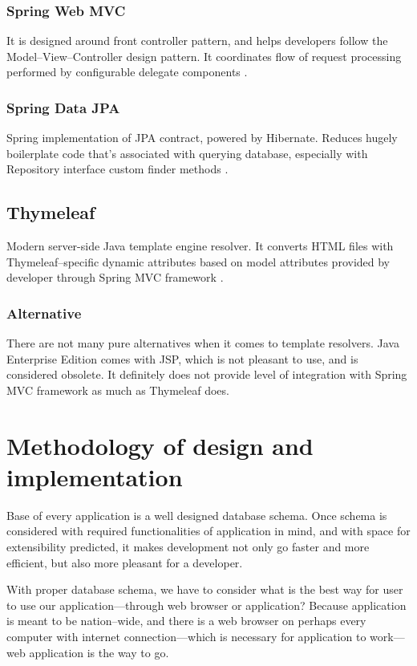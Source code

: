 \documentclass[a4paper,twoside,12pt]{book}
\begin{document}
      \subsubsection{Spring Web MVC}
        It is designed around front controller pattern, and helps developers follow the Model--View--Controller design pattern.
        It coordinates flow of request processing performed by configurable delegate components \cite{bib:spring_web_mvc}.
      
      \subsubsection{Spring Data JPA}
        Spring implementation of JPA contract, powered by Hibernate. Reduces hugely boilerplate code that's associated with querying database,
        especially with Repository interface custom finder methods \cite{bib:spring_data_jpa}.

    \subsection{Thymeleaf}
      Modern server-side Java template engine resolver. 
      It converts HTML files with Thymeleaf--specific dynamic attributes based on model attributes provided by developer through Spring MVC framework \cite{bib:thymeleaf}.
      
      \subsubsection{Alternative}
        There are not many pure alternatives when it comes to template resolvers. 
        Java Enterprise Edition comes with JSP, which is not pleasant to use, and is considered obsolete.
        It definitely does not provide level of integration with Spring MVC framework as much as Thymeleaf does.

  \section{Methodology of design and implementation}
    Base of every application is a well designed database schema. 
    Once schema is considered with required functionalities of application in mind, and with space for extensibility predicted,
    it makes development not only go faster and more efficient, but also more pleasant for a developer.

    With proper database schema, we have to consider what is the best way for user to use our application---through web browser or application?
    Because application is meant to be nation--wide, 
    and there is a web browser on perhaps every computer with internet connection---which is necessary for application to work---web application is the way to go.
    
\end{document}
